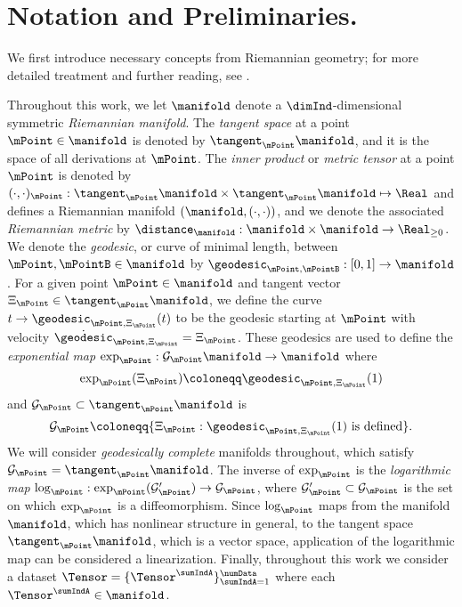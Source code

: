 \section{Notation and Preliminaries.}
\label{sec:notation}
We first introduce necessary concepts from Riemannian geometry; for more detailed treatment and further reading, see \cite{boothby2003introduction,carmo1992riemannian,lee2013smooth,sakai1996riemannian}. 

Throughout this work, we let $\manifold$ denote a $\dimInd$-dimensional symmetric \emph{Riemannian manifold}. The \emph{tangent space} at a point $\mPoint \in \manifold$ is denoted by $\tangent_\mPoint \manifold$, and it is the space of all derivations at $\mPoint$. The \emph{inner product} or \emph{metric tensor} at a point $\mPoint$ is denoted by $(\cdot, \cdot)_\mPoint: \tangent_\mPoint \manifold \times \tangent_\mPoint \manifold \mapsto \Real$ and defines a Riemannian manifold $(\manifold, (\cdot, \cdot))$, and we denote the associated \emph{Riemannian metric} by $\distance_\manifold: \manifold \times \manifold \to \Real_{\geq 0}$. We denote the \emph{geodesic}, or curve of minimal length, between $\mPoint, \mPointB \in \manifold$ by $\geodesic_{\mPoint, \mPointB}:[0,1] \to \manifold$. For a given point $\mPoint \in \manifold$ and tangent vector $\Xi_\mPoint \in \tangent_\mPoint \manifold$, we define the curve $t \to \geodesic_{\mPoint, \Xi_\mPoint} (t)$ to be the geodesic starting at $\mPoint$ with velocity $\dot{\geodesic}_{\mPoint, \Xi_\mPoint} = \Xi_\mPoint$. These geodesics are used to define the \emph{exponential map} $\exp_\mPoint : \mathcal{G}_\mPoint \manifold \to \manifold$ where
\begin{equation}
    \exp_\mPoint (\Xi_\mPoint) \coloneqq \geodesic_{\mPoint, \Xi_\mPoint}(1)
\end{equation}
and $\mathcal{G}_\mPoint \subset \tangent_\mPoint \manifold$ is
\begin{equation}
    \mathcal{G}_\mPoint \coloneqq \{\Xi_\mPoint: \geodesic_{\mPoint, \Xi_\mPoint}(1) \text{ is defined}\}.
\end{equation}
We will consider \emph{geodesically complete} manifolds throughout, which satisfy $\mathcal{G}_\mPoint = \tangent_\mPoint \manifold$. The inverse of $\exp_\mPoint$ is the \emph{logarithmic map} $\log_\mPoint : \exp_\mPoint (\mathcal{G}_\mPoint') \to \mathcal{G}_\mPoint$, where $\mathcal{G}_\mPoint'\subset \mathcal{G}_\mPoint$ is the set on which $\exp_\mPoint$ is a diffeomorphism. Since $\log_\mPoint$ maps from the manifold $\manifold$, which has nonlinear structure in general, to the tangent space $\tangent_\mPoint \manifold$, which is a vector space, application of the logarithmic map can be considered a linearization. Finally, throughout this work we consider a dataset $\Tensor=\{\Tensor^\sumIndA\}_{\sumIndA=1}^\numData$ where each $\Tensor^\sumIndA \in \manifold$. 

